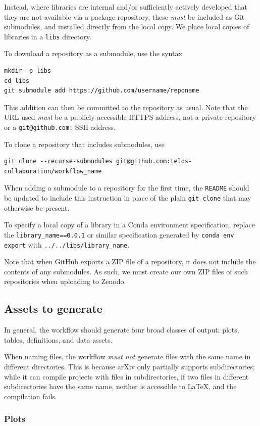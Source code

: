 \documentclass{article}
\newcommand\rfcword[1]{\emph{#1}\xspace}
\newcommand\must{\rfcword{must}}
\newcommand\mustnot{\rfcword{must not}}
\newcommand\filename[1]{\texttt{#1}\xspace}
\newcommand\readme{\filename{README}}
\begin{document}
Instead,
where libraries are internal and/or sufficiently actively developed that
they are not available via a package repository,
these \must be included as Git submodules,
and installed directly from the local copy.
We place local copies of libraries in a \filename{libs} directory.

To download a repository as a submodule,
use the syntax
\begin{verbatim}
mkdir -p libs
cd libs
git submodule add https://github.com/username/reponame
\end{verbatim}
This addition can then be committed to the repository as usual.
Note that the URL used \must be a publicly-accessible HTTPS address,
not a private repository or a \texttt{git@github.com:} SSH address.

To clone a repository that includes submodules,
use
\begin{verbatim}
git clone --recurse-submodules git@github.com:telos-collaboration/workflow_name
\end{verbatim}
When adding a submodule to a repository for the first time,
the \readme should be updated to include this instruction in place of
the plain \texttt{git clone} that may otherwise be present.

To specify a local copy of a library in a Conda environment specification,
replace the \verb|library_name==0.0.1| or similar specification
generated by \texttt{conda env export}
with \verb|../../libs/library_name|.

Note that when GitHub exports a ZIP file of a repository,
it does not include the contents of any submodules.
As such,
we must create our own ZIP files of such repositories when uploading to Zenodo.

\subsection{Assets to generate}\label{sec:assets}

In general,
the workflow should generate four broad classes of output:
plots,
tables,
definitions,
and data assets.

When naming files,
the workflow \mustnot generate files with the same name in different directories.
This is because arXiv only partially supports subdirectories;
while it can compile projects with files in subdirectories,
if two files in different subdirectories have the same name,
neither is accessible to LaTeX,
and the compilation fails.

\subsubsection{Plots}
\end{document}
